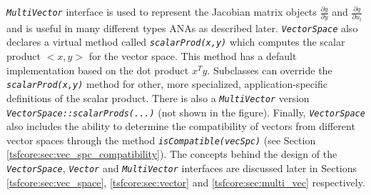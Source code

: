 \documentclass[10pt,fleqn]{article}
\begin{document}
\texttt{\textit{MultiVector}} interface is used to represent the
Jacobian matrix objects $\frac{\partial g}{\partial y}$ and
$\frac{\partial g}{\partial u_l}$ and is useful in many different
types ANAs as described later.
\texttt{\textit{VectorSpace}} also declares a virtual method called
\texttt{\textit{scalarProd(x,y)}} which computes the scalar product
$<x,y>$ for the vector space. This method has a default implementation
based on the dot product $x^T y$.  Subclasses can override the
\texttt{\textit{scalarProd(x,y)}} method for other, more specialized,
application-specific definitions of the scalar product. There is also
a \texttt{\textit{MultiVector}} version
\texttt{\textit{VectorSpace\-::scalarProds(...)}} (not shown in the
figure).  Finally, \texttt{\textit{VectorSpace}} also includes the
ability to determine the compatibility of vectors from different
vector spaces through the method
\texttt{\textit{isCompatible(vecSpc)}} (see Section
\ref{tsfcore:sec:vec_spc_compatibility}).  The concepts behind the design
of the \texttt{\textit{VectorSpace}},
\texttt{\textit{Vector}} and
\texttt{\textit{MultiVector}} interfaces are discussed later in Sections
\ref{tsfcore:sec:vec_space}, \ref{tsfcore:sec:vector} and \ref{tsfcore:sec:multi_vec}
respectively.
\end{document}
